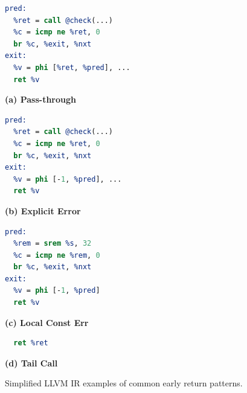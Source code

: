 \begin{figure}[ht]
\begin{minipage}{0.36\textwidth}
    \begin{minipage}{\linewidth}
        \begin{lstlisting}[language=llvm, frame=single, breaklines=true]
pred:
  %ret = call @check(...)
  %c = icmp ne %ret, 0
  br %c, %exit, %nxt
exit: 
  %v = phi [%ret, %pred], ...
  ret %v
        \end{lstlisting}
        \centerline{\textbf{(a) Pass-through}}
    \end{minipage}
    \begin{minipage}{\linewidth}
        \begin{lstlisting}[language=llvm, frame=single, breaklines=true]
pred:
  %ret = call @check(...)
  %c = icmp ne %ret, 0
  br %c, %exit, %nxt
exit: 
  %v = phi [-1, %pred], ...
  ret %v
        \end{lstlisting}
        \centerline{\textbf{(b) Explicit Error}}
    \end{minipage}
    \begin{minipage}{\linewidth}
        \begin{lstlisting}[language=llvm, frame=single, breaklines=true]
pred:
  %rem = srem %s, 32
  %c = icmp ne %rem, 0
  br %c, %exit, %nxt
exit: 
  %v = phi [-1, %pred]
  ret %v
        \end{lstlisting}
        \centerline{\textbf{(c) Local Const Err}}
    \end{minipage}
    \begin{minipage}{\linewidth}
        \begin{lstlisting}[language=llvm, frame=single, breaklines=true]
  %ret = call @check
  ret %ret
        \end{lstlisting}
        \centerline{\textbf{(d) Tail Call}}
    \end{minipage}
    \vspace{-10pt} %
    \caption{Simplified LLVM IR examples of common early return patterns.}
    \label{fig:early-return-patterns}
  \end{minipage}
\end{figure}


